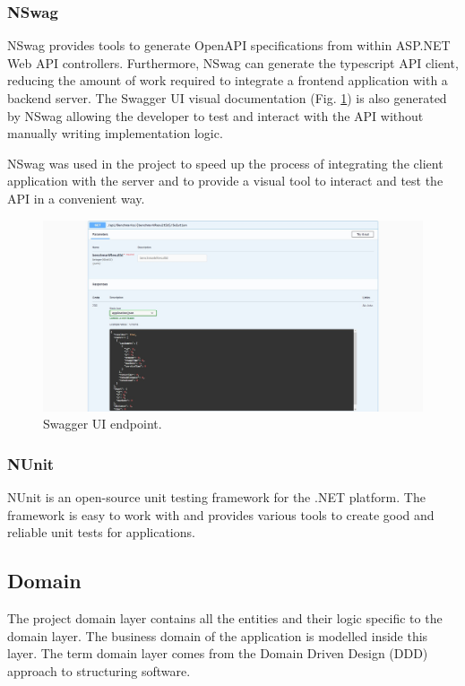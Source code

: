 \documentclass[a4paper,twoside,12pt]{book}
\begin{document}
\subsubsection{NSwag}
NSwag provides tools to generate OpenAPI specifications from within ASP.NET Web API controllers. Furthermore, NSwag can generate the typescript API client, reducing the amount of work required to integrate a frontend application with a backend server. The Swagger UI visual documentation (Fig. \ref{fig:swaggerEndpoint}) is also generated by NSwag allowing the developer to test and interact with the API without manually writing implementation logic.  

NSwag was used in the project to speed up the process of integrating the client application with the server and to provide a visual tool to interact and test the API in a convenient way.

\begin{figure} [H]
\centering
\includegraphics[width=\textwidth]{images/swaggerUI.jpg}
\caption{Swagger UI endpoint.}
\label{fig:swaggerEndpoint}
\end{figure}

\subsubsection{NUnit}
NUnit is an open-source unit testing framework for the .NET platform. The framework is easy to work with and provides various tools to create good and reliable unit tests for applications.

\subsection{Domain}

The project domain layer contains all the entities and their logic specific to the domain layer. The business domain of the application is modelled inside this layer. The term domain layer comes from the Domain Driven Design (DDD) approach to structuring software. 
\end{document}
